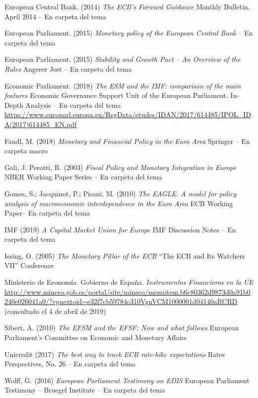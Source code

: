 \documentclass{nuevotema}
\begin{document}
European Central Bank. (2014) \textit{The ECB's Forward Guidance} Monthly Bulletin, April 2014 -- En carpeta del tema

European Parliament. (2015) \textit{Monetary policy of the European Central Bank}  -- En carpeta del tema

European Parliament. (2015) \textit{Stability and Growth Pact -- An Overview of the Rules} Angerer Jost -- En carpeta del tema

Economic Parliament. (2018) \textit{The ESM and the IMF: comparison of the main features} Economic Governance Support Unit of the European Parliament. In-Depth Analysis -- En carpeta del tema \url{https://www.europarl.europa.eu/RegData/etudes/IDAN/2017/614485/IPOL_IDA(2017)614485_EN.pdf}

Fandl, M. (2018) \textit{Monetary and Financial Policy in the Euro Area}  Springer -- En carpeta macro

Gali, J. Perotti, R. (2003) \textit{Fiscal Policy and Monetary Integration in Europe}  NBER Working Paper Series -- En carpeta del tema

Gomes, S.; Jacquinot, P.; Pisani, M. (2010) \textit{The EAGLE. A model for policy analysis of macroeconomic interdependence in the Euro Area} ECB Working Paper-- En carpeta del tema

IMF (2019) \textit{A Capital Market Union for Europe} IMF Discussion Notes -- En carpeta del tema

Issing, O. (2005) \textit{The Monetary Pillar of the ECB}  ``The ECB and Its Watchers VII'' Conference 

Ministerio de Economía. Gobierno de España. \textit{Instrumentos Financieros en la UE} \url{http://www.mineco.gob.es/portal/site/mineco/menuitem.b6c80362d9873d0a91b0240e026041a0/?vgnextoid=e32f7cb59784c310VgnVCM1000001d04140aRCRD} (consultado el 4 de abril de 2019)

Sibert, A. (2010) \textit{The EFSM and the EFSF: Now and what follows}  European Parliament's Committee on Economic and Monetary Affairs

Unicredit (2017) \textit{The best way to track ECB rate-hike expectations} Rates Perspectives, No. 26 -- En carpeta del tema

Wolff, G. (2016) \textit{European Parliament Testimony on EDIS}  European Parliament Testimony -- Bruegel Institute -- En carpeta del tema
\end{document}
